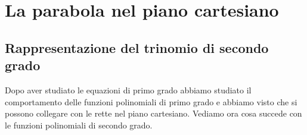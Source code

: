 


\chapter{La parabola nel piano cartesiano}

%
%
%
%
%
%
%
%
%
%
%
%

\section{Rappresentazione del trinomio di secondo grado}
\label{sec:parabola_rappresentazionetrinomio}

Dopo aver studiato le equazioni di primo grado abbiamo studiato il
comportamento delle funzioni polinomiali di primo grado e abbiamo visto che
si possono collegare con le rette nel piano cartesiano.
Vediamo ora cosa succede con le funzioni polinomiali di secondo grado.

